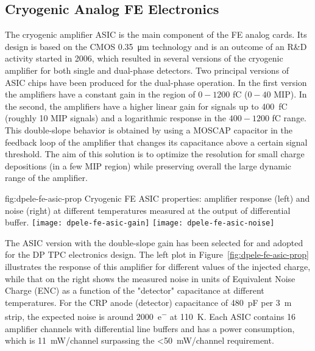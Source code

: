 \subsection{Cryogenic Analog FE Electronics}
\label{sec:fddp-tpc-elec-design-cryofe}

The cryogenic amplifier ASIC is the main component of the FE analog cards. Its design is based on the CMOS \SI{0.35}{\micro\meter} technology and is an outcome of an R\&D  activity started in 2006, which resulted in several versions of the cryogenic amplifier for both single and dual-phase  detectors. Two principal versions of ASIC chips have been produced for the dual-phase  operation. In the first version the amplifiers have a constant gain in the region of $0-1200$ \si{\femto\coulomb} ($0-40$ MIP). In the second, the amplifiers have a higher linear gain for signals up to \SI{400}{\femto\coulomb} (roughly 10 MIP signals) and a logarithmic response in the $400-1200$ \si{\femto\coulomb} range. This double-slope behavior is obtained by using a MOSCAP capacitor in the feedback loop of the amplifier that changes its capacitance above a certain signal threshold. The aim of this solution is to optimize the resolution for small charge depositions (in a few MIP region) while preserving overall the large dynamic range of the amplifier.

\begin{dunefigure}{fig:dpele-fe-asic-prop}
{Cryogenic FE ASIC properties: amplifier response (left) and noise (right) at different temperatures measured at the output of differential buffer.}
\texttt{[image: dpele-fe-asic-gain]}
\texttt{[image: dpele-fe-asic-noise]}
\end{dunefigure}

The ASIC version with the double-slope gain has been selected for  and adopted for the DP TPC electronics design. The left plot in Figure~\ref{fig:dpele-fe-asic-prop} illustrates the response of this amplifier for different values of the injected charge, while that on the right shows the measured noise in units of Equivalent Noise Charge (ENC) as a function of the "detector" capacitance at different temperatures. For the CRP anode (detector) capacitance of \SI{480}{\pico\farad} per \SI{3}{\metre} strip, the expected noise is around \SI{2000}{e^{-}} at \SI{110}{\kelvin}. Each ASIC contains \num{16} amplifier channels with differential line buffers and has a power consumption, which is \SI{11}{\milli\watt/channel} surpassing the \SI{<50}{\milli\watt/channel} requirement. 


